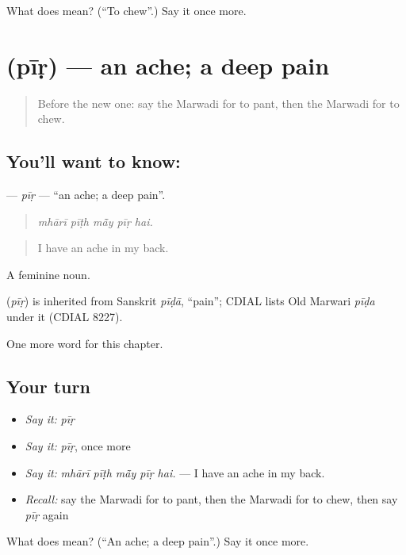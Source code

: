 \begin{tcolorbox}[breakable,colback=teal!4,colframe=teal!35!black,title={Before you move on}]
What does  mean? (\textquotedblleft{}To chew\textquotedblright{}.) Say it once more.
\end{tcolorbox}
\section[\texorpdfstring{\mw{पीड़} (pīṛ)}{पीड़ (pīṛ)}]{ (pīṛ) — an ache; a deep pain}

\label{lesson:MW-C252-pir}



\begin{quote}
Before the new one: say the Marwadi for to pant, then the Marwadi for to chew.
\end{quote}

\subsection*{You'll want to know: }
\textbf{} — \emph{pīṛ} — \textquotedblleft{}an ache; a deep pain\textquotedblright{}.

\begin{quote}
    
\end{quote}

\begin{quote}
\emph{mhārī pīṭh mā̃y pīṛ hai.}
\end{quote}

\begin{quote}
I have an ache in my back.
\end{quote}

A feminine noun.

\begin{cousinweb}
\textbf{} (\emph{pīṛ}) is inherited from Sanskrit \emph{pīḍā}, \textquotedblleft{}pain\textquotedblright{}; CDIAL lists Old Marwari \emph{pīḍa} under it (CDIAL 8227).
\end{cousinweb}

\begin{grammarlens}[title={What you've built}]
One more word for this chapter.
\end{grammarlens}

\subsection*{Your turn}
\begin{itemize}
\raggedright
  \item \emph{Say it:} \emph{pīṛ}
  \item \emph{Say it:} \emph{pīṛ}, once more
  \item \emph{Say it:} \emph{mhārī pīṭh mā̃y pīṛ hai.} — I have an ache in my back.
  \item \emph{Recall:} say the Marwadi for to pant, then the Marwadi for to chew, then say \emph{pīṛ} again
\end{itemize}

\begin{tcolorbox}[breakable,colback=teal!4,colframe=teal!35!black,title={Before you move on}]
What does  mean? (\textquotedblleft{}An ache; a deep pain\textquotedblright{}.) Say it once more.
\end{tcolorbox}
